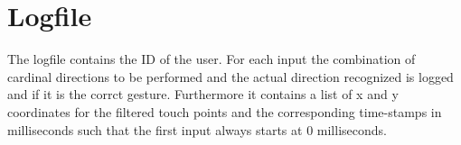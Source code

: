 \documentclass[10pt,a4paper,twocolumn]{article}
\begin{document}
\section*{Logfile}
The logfile contains the ID of the user. For each input the combination of cardinal directions to be performed and the actual direction recognized is logged and if it is the corrct gesture. Furthermore it contains a list of x and y  coordinates for the filtered touch points and the corresponding time-stamps in milliseconds such that the first input always starts at 0 milliseconds. 
\end{document}
